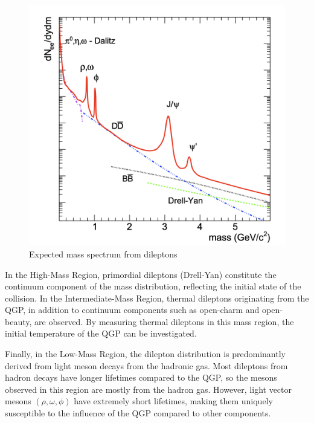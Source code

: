         \begin{figure}[hbtp]
            \centering
            \includegraphics[keepaspectratio, scale=0.3]{fig/1_6_expected_dileptonMass.png}
            \caption{Expected mass spectrum from dileptons\cite{Rapp:1999ej}}
            \label{Intro:Dilepton:dilepton_mass}
        \end{figure}
        
        In the High-Mass Region, primordial dileptons (Drell-Yan) constitute the continuum component of the mass distribution, reflecting the initial state of the collision. In the Intermediate-Mass Region, thermal dileptons originating from the QGP, in addition to continuum components such as open-charm and open-beauty, are observed. By measuring thermal dileptons in this mass region, the initial temperature of the QGP can be investigated.  
        
        Finally, in the Low-Mass Region, the dilepton distribution is predominantly derived from light meson decays from the hadronic gas. Most dileptons from hadron decays have longer lifetimes compared to the QGP, so the mesons observed in this region are mostly from the hadron gas. However, light vector mesons $(\rho, \omega, \phi)$ have extremely short lifetimes, making them uniquely susceptible to the influence of the QGP compared to other components.
